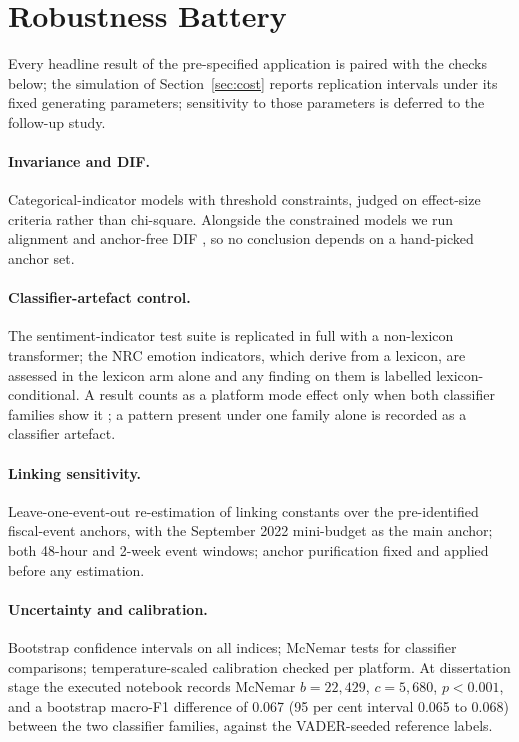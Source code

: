 
\appendix

\section{Robustness Battery}

Every headline result of the pre-specified application is paired with the checks below; the simulation of Section~\ref{sec:cost} reports replication intervals under its fixed generating parameters; sensitivity to those parameters is deferred to the follow-up study.

\paragraph{Invariance and DIF.} Categorical-indicator models with threshold constraints, judged on effect-size criteria rather than chi-square. Alongside the constrained models we run alignment \citep{muthen2018} and anchor-free DIF \citep{chen2023}, so no conclusion depends on a hand-picked anchor set.

\paragraph{Classifier-artefact control.} The sentiment-indicator test suite is replicated in full with a non-lexicon transformer; the NRC emotion indicators, which derive from a lexicon, are assessed in the lexicon arm alone and any finding on them is labelled lexicon-conditional. A result counts as a platform mode effect only when both classifier families show it \citep{czarnek2022}; a pattern present under one family alone is recorded as a classifier artefact.

\paragraph{Linking sensitivity.} Leave-one-event-out re-estimation of linking constants over the pre-identified fiscal-event anchors, with the September 2022 mini-budget as the main anchor; both 48-hour and 2-week event windows; anchor purification fixed and applied before any estimation.

\paragraph{Uncertainty and calibration.} Bootstrap confidence intervals on all indices; McNemar tests for classifier comparisons; temperature-scaled calibration checked per platform. At dissertation stage the executed notebook records McNemar $b=22{,}429$, $c=5{,}680$, $p<0.001$, and a bootstrap macro-F1 difference of 0.067 (95 per cent interval 0.065 to 0.068) between the two classifier families, against the VADER-seeded reference labels.

